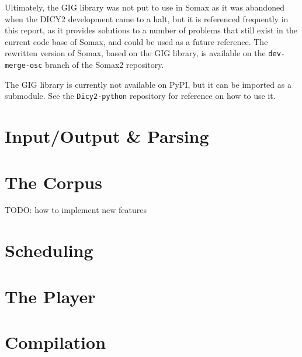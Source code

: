 Ultimately, the GIG library was not put to use in Somax as it was abandoned when the DICY2 development came to a halt, but it is referenced frequently in this report, as it provides solutions to a number of problems that still exist in the current code base of Somax, and could be used as a future reference. The rewritten version of Somax, based on the GIG library, is available on the \texttt{dev-merge-osc} branch of the Somax2 repository.

The GIG library is currently not available on PyPI, but it can be imported as a submodule. See the \texttt{Dicy2-python} repository \cite{dicy2pythonrepo} for reference on how to use it.


\section{Input/Output \& Parsing}\label{ssec:2-io-parsing}



\section{The Corpus}\label{ssec:2-corpus}
TODO: how to implement new features

\section{Scheduling}\label{ssec:2-scheduling}

\section{The Player}\label{ssec:2-player}

\section{Compilation}\label{ssec:2-compilation}

